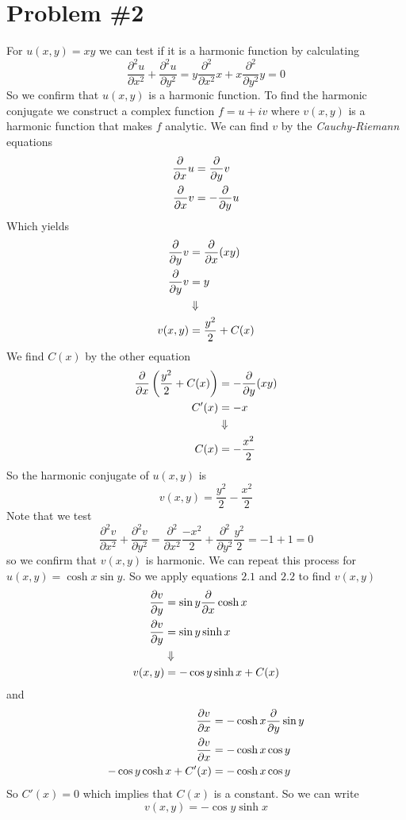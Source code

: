 \documentclass[11pt]{article}
\numberwithin{equation}{section}
\begin{document}
\section{Problem \#2}
For $u(x,y)=xy$ we can test if it is a harmonic function by calculating
$$\frac{\partial^2u}{\partial x^2} + \frac{\partial^2u}{\partial y^2} = y\frac{\partial^2}{\partial x^2}x + x\frac{\partial^2}{\partial y^2}y = 0$$ 
So we confirm that $u(x,y)$ is a harmonic function. To find the harmonic conjugate we 
construct a complex function $f=u+iv$ where $v(x,y)$ is a harmonic function that makes $f$
analytic. We can find $v$ by the \emph{Cauchy-Riemann} equations
\begin{align}
\frac{\partial{}}{\partial{x}}u &= \frac{\partial{}}{\partial{y}}v\\
\frac{\partial{}}{\partial{x}}v &= -\frac{\partial{}}{\partial{y}}u
\end{align}
Which yields
\begin{align*}
\frac{\partial{}}{\partial{y}}v &= \frac{\partial{}}{\partial{x}}(xy)\\
\frac{\partial{}}{\partial{y}}v &= y\\
&\Downarrow\\
v(x,y) &= \frac{y^2}{2} + C(x)
\end{align*}
We find $C(x)$ by the other equation
\begin{align*}
\frac{\partial{}}{\partial{x}}\left(\frac{y^2}{2}+C(x)\right) &= -\frac{\partial{}}{\partial{y}}(xy)\\
C'(x) &= -x\\
&\Downarrow\\
C(x) &= -\frac{x^2}{2}
\end{align*}
So the harmonic conjugate of $u(x,y)$ is 
$$v(x,y) = \frac{y^2}{2} - \frac{x^2}{2}$$
Note that we test
$$\frac{\partial^2v}{\partial x^2} + \frac{\partial^2v}{\partial y^2} = \frac{\partial^2}{\partial x^2}\frac{-x^2}{2} + \frac{\partial^2}{\partial y^2}\frac{y^2}{2} =-1+1 =  0$$ 
so we confirm that $v(x,y)$ is harmonic. We can repeat this process for $u(x,y) = \cosh{x}\sin{y}$.
So we apply equations $2.1$ and $2.2$ to find $v(x,y)$
\begin{align*}
\frac{\partial{v}}{\partial{y}} &= \sin{y}\frac{\partial{}}{\partial{x}}\cosh{x}\\
\frac{\partial{v}}{\partial{y}} &= \sin{y}\sinh{x}\\
&\Downarrow\\
v(x,y) &= -\cos{y}\sinh{x} + C(x)
\end{align*}
and
\begin{align*}
\frac{\partial{v}}{\partial{x}} &= -\cosh{x}\frac{\partial{}}{\partial{y}}\sin{y}\\
\frac{\partial{v}}{\partial{x}} &= -\cosh{x}\cos{y}\\
-\cos{y}\cosh{x}+C'(x) &= -\cosh{x}\cos{y}\\
\end{align*}
So $C'(x)=0$ which implies that $C(x)$ is a constant. So we can write
$$v(x,y) = -\cos{y}\sinh{x}$$ 
\end{document}
